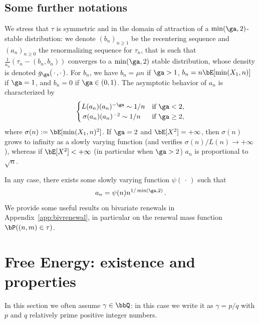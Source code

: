 \subsection{Some further notations}\label{sec:defan}

We stress that $\tau$ is symmetric and in the domain of attraction of a $\min(\ga,2)$-stable distribution: we denote $(b_n)_{n\geq 1}$ be the recentering sequence and ${(a_n)}_{n \ge 0}$ the renormalizing sequence for $\tau_n$, that is such that $\tfrac{1}{a_n} (\tau_n - (b_n,b_n))$ converges to a $\min(\ga,2)$ stable distribution, whose density is denoted $g_\ga({\,\cdot\,,\cdot\,})$. For $b_n$, we have $b_n=\mu n$ if $\ga>1$, $b_n= n\bE[\min(X_1, n)]$ if $\ga=1$, and $b_n=0$ if $\ga \in(0,1)$. The asymptotic behavior of $a_n$ is characterized by
\begin{equation}\label{def:an}
\begin{cases}
L(a_n) (a_n)^{-\ga} \sim 1/n &\text{if } \ga<2,\\
\,\sigma(a_n) (a_n)^{-2} \sim 1/n &\text{if } \ga\geq 2,
\end{cases}
\end{equation}
where $\sigma(n):=\bE[\min(X_1, n)^2]$. If $\ga = 2$ and $\bE[X^2]=+\infty$, then $\sigma(n)$ grows to infinity as a slowly varying function (and verifies $\sigma(n)/L(n) \to +\infty$), whereas if $\bE[X^2]<+\infty$ (in particular when $\ga>2$) $a_n$ is proportional to $\sqrt{n}$.

In any case, there exists some slowly varying function $\psi({\,\cdot\,})$ such that
\begin{equation}
a_n = \psi(n) n^{1/\min(\ga, 2)}\,.\label{an}
\end{equation}
We provide some useful results on bivariate renewals in Appendix~\ref{app:bivrenewal}, in particular on the renewal mass function $\bP((n,m)\in\tau)$.


\section{Free Energy: existence and properties}\label{sec:existence}

In this section we often assume $\gamma\in \bbQ$: in this case we write it as $\gamma=p/q$ with $p$ and $q$ relatively prime positive integer numbers.


